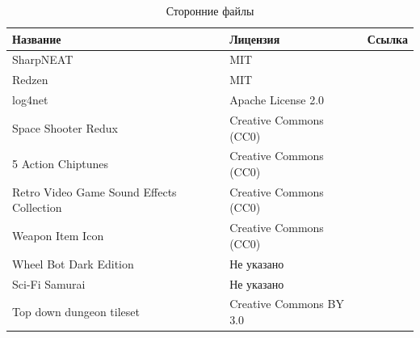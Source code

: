 \begin{center}
    \begin{longtable}{|p{6cm}|p{6cm}|p{2cm}|}
        \caption{Сторонние файлы}\\
        \hline
        Название & Лицензия & Ссылка\\
        \hline
        \hline
        SharpNEAT & MIT &\cite{s8}\\
        \hline
        Redzen & MIT &\cite{s17}\\
        \hline
        log4net & Apache License 2.0 &\cite{s18}\\
        \hline
        Space Shooter Redux & Creative Commons (CC0) &\cite{s19}\\
        \hline
        5 Action Chiptunes & Creative Commons (CC0) &\cite{s20}\\
        \hline
        Retro Video Game Sound Effects Collection & Creative Commons (CC0) &\cite{s21}\\
        \hline
        Weapon Item Icon & Creative Commons (CC0) &\cite{s22}\\
        \hline
        Wheel Bot Dark Edition & Не указано &\cite{s23}\\
        \hline
        Sci-Fi Samurai & Не указано &\cite{s24}\\
        \hline
        Top down dungeon tileset & Creative Commons BY 3.0 &\cite{s25}\\
        \hline
    \end{longtable}
\end{center}

